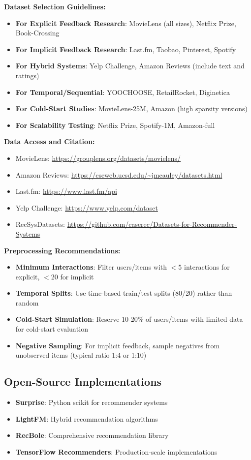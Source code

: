 \textbf{Dataset Selection Guidelines:}
\begin{itemize}
    \item \textbf{For Explicit Feedback Research}: MovieLens (all sizes), Netflix Prize, Book-Crossing
    \item \textbf{For Implicit Feedback Research}: Last.fm, Taobao, Pinterest, Spotify
    \item \textbf{For Hybrid Systems}: Yelp Challenge, Amazon Reviews (include text and ratings)
    \item \textbf{For Temporal/Sequential}: YOOCHOOSE, RetailRocket, Diginetica
    \item \textbf{For Cold-Start Studies}: MovieLens-25M, Amazon (high sparsity versions)
    \item \textbf{For Scalability Testing}: Netflix Prize, Spotify-1M, Amazon-full
\end{itemize}

\textbf{Data Access and Citation:}
\begin{itemize}
    \item MovieLens: \url{https://grouplens.org/datasets/movielens/}
    \item Amazon Reviews: \url{https://cseweb.ucsd.edu/~jmcauley/datasets.html}
    \item Last.fm: \url{https://www.last.fm/api}
    \item Yelp Challenge: \url{https://www.yelp.com/dataset}
    \item RecSysDatasets: \url{https://github.com/caserec/Datasets-for-Recommender-Systems}
\end{itemize}

\textbf{Preprocessing Recommendations:}
\begin{itemize}
    \item \textbf{Minimum Interactions}: Filter users/items with $<$5 interactions for explicit, $<$20 for implicit
    \item \textbf{Temporal Splits}: Use time-based train/test splits (80/20) rather than random
    \item \textbf{Cold-Start Simulation}: Reserve 10-20\% of users/items with limited data for cold-start evaluation
    \item \textbf{Negative Sampling}: For implicit feedback, sample negatives from unobserved items (typical ratio 1:4 or 1:10)
\end{itemize}

\subsection{Open-Source Implementations}
\begin{itemize}
    \item \textbf{Surprise}: Python scikit for recommender systems
    \item \textbf{LightFM}: Hybrid recommendation algorithms
    \item \textbf{RecBole}: Comprehensive recommendation library
    \item \textbf{TensorFlow Recommenders}: Production-scale implementations
\end{itemize}

